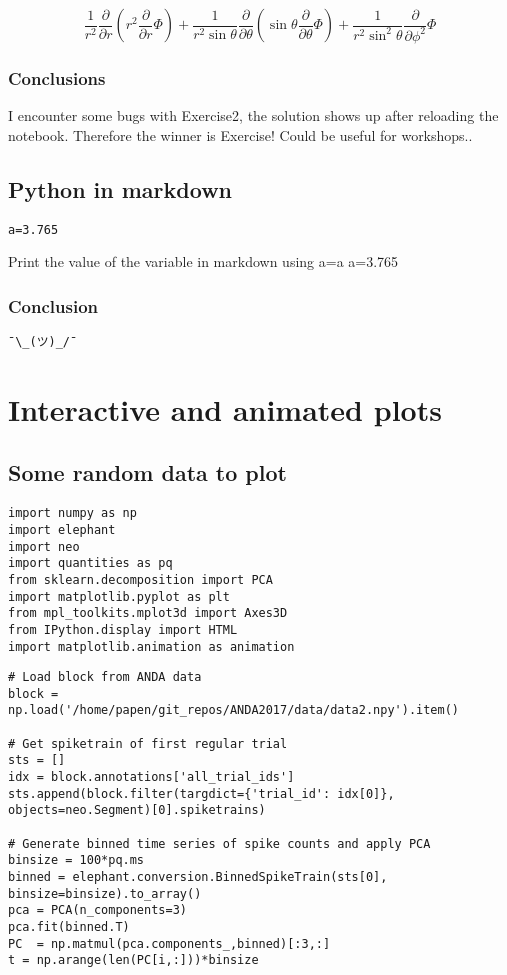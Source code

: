     \begin{equation}
\frac{1}{r^2}\frac{\partial}{\partial r} \left( r^2 \frac{\partial}{\partial r} \Phi \right) + \frac{1}{r^2 \sin\theta}\frac{\partial}{\partial \theta} \left( \sin\theta \frac{\partial}{\partial \theta} \Phi \right) + \frac{1}{r^2 \sin^2\theta}\frac{\partial}{\partial \phi^2} \Phi
\end{equation}

    \subsubsection{Conclusions}\label{conclusions}

I encounter some bugs with Exercise2, the solution shows up after
reloading the notebook. Therefore the winner is Exercise! Could be
useful for workshops..

    \subsection{Python in markdown}\label{python-in-markdown}
%
\begin{lstlisting}
a=3.765
\end{lstlisting}
    Print the value of the variable in markdown using
a={{a}}
    a=3.765

    \subsubsection{Conclusion}\label{conclusion}

\texttt{¯\textbackslash{}\_(ツ)\_/¯}

    \section{Interactive and animated
plots}\label{interactive-and-animated-plots}

\subsection{Some random data to plot}\label{some-random-data-to-plot}
%
\begin{lstlisting}
import numpy as np
import elephant
import neo
import quantities as pq
from sklearn.decomposition import PCA
import matplotlib.pyplot as plt
from mpl_toolkits.mplot3d import Axes3D
from IPython.display import HTML
import matplotlib.animation as animation
\end{lstlisting}%
\begin{lstlisting}
# Load block from ANDA data
block = np.load('/home/papen/git_repos/ANDA2017/data/data2.npy').item()

# Get spiketrain of first regular trial
sts = []
idx = block.annotations['all_trial_ids']
sts.append(block.filter(targdict={'trial_id': idx[0]}, objects=neo.Segment)[0].spiketrains)

# Generate binned time series of spike counts and apply PCA
binsize = 100*pq.ms
binned = elephant.conversion.BinnedSpikeTrain(sts[0], binsize=binsize).to_array()
pca = PCA(n_components=3)
pca.fit(binned.T)
PC  = np.matmul(pca.components_,binned)[:3,:]
t = np.arange(len(PC[i,:]))*binsize
\end{lstlisting}
